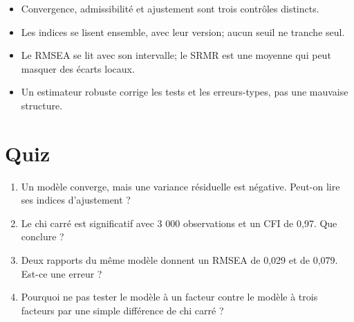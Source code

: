 \documentclass[
  french,
  11pt,
  a4paper,
  DIV=11,
  numbers=noendperiod]{scrreprt}
\providecommand{\tightlist}{%
  \setlength{\itemsep}{0pt}\setlength{\parskip}{0pt}}
\begin{document}
\begin{tcolorbox}[enhanced jigsaw, arc=.35mm, bottomrule=.15mm, bottomtitle=1mm, breakable, colback=white, colbacktitle=quarto-callout-important-color!10!white, colframe=quarto-callout-important-color-frame, coltitle=black, left=2mm, leftrule=.75mm, opacityback=0, opacitybacktitle=0.6, rightrule=.15mm, title={À retenir}, titlerule=0mm, toprule=.15mm, toptitle=1mm]

\begin{itemize}
\tightlist
\item
  Convergence, admissibilité et ajustement sont trois contrôles
  distincts.
\item
  Les indices se lisent ensemble, avec leur version; aucun seuil ne
  tranche seul.
\item
  Le RMSEA se lit avec son intervalle; le SRMR est une moyenne qui peut
  masquer des écarts locaux.
\item
  Un estimateur robuste corrige les tests et les erreurs-types, pas une
  mauvaise structure.
\end{itemize}

\end{tcolorbox}

\section{Quiz}\label{quiz-3}

\begin{enumerate}
\def\labelenumi{\arabic{enumi}.}
\tightlist
\item
  Un modèle converge, mais une variance résiduelle est négative. Peut-on
  lire ses indices d'ajustement ?
\item
  Le chi carré est significatif avec 3 000 observations et un CFI de
  0,97. Que conclure ?
\item
  Deux rapports du même modèle donnent un RMSEA de 0,029 et de 0,079.
  Est-ce une erreur ?
\item
  Pourquoi ne pas tester le modèle à un facteur contre le modèle à trois
  facteurs par une simple différence de chi carré ?
\end{enumerate}
\end{document}
